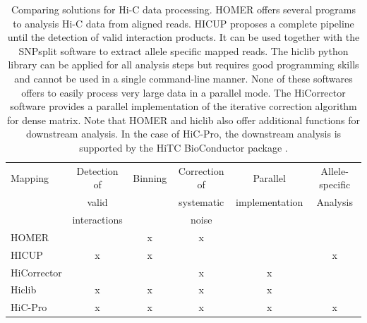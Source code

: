 \begin{table}
\begin{tabular}{lccccc}
\hline
Mapping & Detection of & Binning & Correction of & Parallel & Allele-specific \\
& valid & & systematic & implementation & Analysis \\
& interactions & & noise  & & \\
\hline
HOMER & & x & x & & \\
HICUP & x & x  & & & x\\
HiCorrector & & & x & x & \\
Hiclib & x & x & x & x & \\
HiC-Pro & x & x & x & x & x \\
\end{tabular}
\caption{Comparing solutions for Hi-C data processing. HOMER offers several
programs to analysis Hi-C data from aligned reads. HICUP proposes a complete
pipeline until the detection of valid interaction products. It can be used
together with the SNPsplit software to extract allele specific mapped reads.
The hiclib python library can be applied for all analysis steps but requires
good programming skills and cannot be used in a single command-line manner.
None of these softwares offers to easily process very large data in a parallel
mode. The HiCorrector software \citep{li:hi-corrector} provides a parallel
implementation of the iterative correction algorithm for dense matrix. Note
that HOMER and hiclib also offer additional functions for downstream analysis.
In the case of HiC-Pro, the downstream analysis is supported by the HiTC
BioConductor package \citep{servant:hitc}.}
\label{table:table1}
\end{table}


